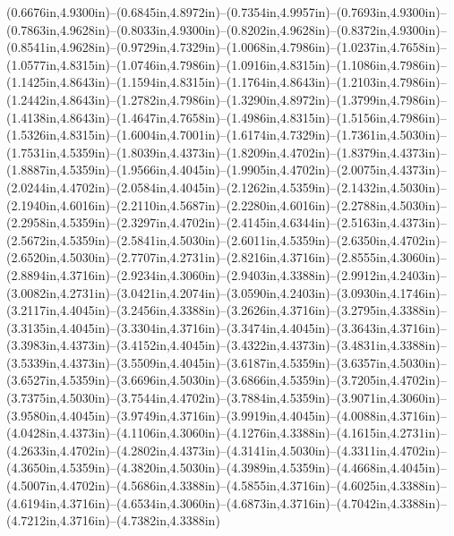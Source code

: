 (0.6676in,4.9300in)--(0.6845in,4.8972in)--(0.7354in,4.9957in)--(0.7693in,4.9300in)--(0.7863in,4.9628in)--(0.8033in,4.9300in)--(0.8202in,4.9628in)--(0.8372in,4.9300in)--(0.8541in,4.9628in)--(0.9729in,4.7329in)--(1.0068in,4.7986in)--(1.0237in,4.7658in)--(1.0577in,4.8315in)--(1.0746in,4.7986in)--(1.0916in,4.8315in)--(1.1086in,4.7986in)--(1.1425in,4.8643in)--(1.1594in,4.8315in)--(1.1764in,4.8643in)--(1.2103in,4.7986in)--(1.2442in,4.8643in)--(1.2782in,4.7986in)--(1.3290in,4.8972in)--(1.3799in,4.7986in)--(1.4138in,4.8643in)--(1.4647in,4.7658in)--(1.4986in,4.8315in)--(1.5156in,4.7986in)--(1.5326in,4.8315in)--(1.6004in,4.7001in)--(1.6174in,4.7329in)--(1.7361in,4.5030in)--(1.7531in,4.5359in)--(1.8039in,4.4373in)--(1.8209in,4.4702in)--(1.8379in,4.4373in)--(1.8887in,4.5359in)--(1.9566in,4.4045in)--(1.9905in,4.4702in)--(2.0075in,4.4373in)--(2.0244in,4.4702in)--(2.0584in,4.4045in)--(2.1262in,4.5359in)--(2.1432in,4.5030in)--(2.1940in,4.6016in)--(2.2110in,4.5687in)--(2.2280in,4.6016in)--(2.2788in,4.5030in)--(2.2958in,4.5359in)--(2.3297in,4.4702in)--(2.4145in,4.6344in)--(2.5163in,4.4373in)--(2.5672in,4.5359in)--(2.5841in,4.5030in)--(2.6011in,4.5359in)--(2.6350in,4.4702in)--(2.6520in,4.5030in)--(2.7707in,4.2731in)--(2.8216in,4.3716in)--(2.8555in,4.3060in)--(2.8894in,4.3716in)--(2.9234in,4.3060in)--(2.9403in,4.3388in)--(2.9912in,4.2403in)--(3.0082in,4.2731in)--(3.0421in,4.2074in)--(3.0590in,4.2403in)--(3.0930in,4.1746in)--(3.2117in,4.4045in)--(3.2456in,4.3388in)--(3.2626in,4.3716in)--(3.2795in,4.3388in)--(3.3135in,4.4045in)--(3.3304in,4.3716in)--(3.3474in,4.4045in)--(3.3643in,4.3716in)--(3.3983in,4.4373in)--(3.4152in,4.4045in)--(3.4322in,4.4373in)--(3.4831in,4.3388in)--(3.5339in,4.4373in)--(3.5509in,4.4045in)--(3.6187in,4.5359in)--(3.6357in,4.5030in)--(3.6527in,4.5359in)--(3.6696in,4.5030in)--(3.6866in,4.5359in)--(3.7205in,4.4702in)--(3.7375in,4.5030in)--(3.7544in,4.4702in)--(3.7884in,4.5359in)--(3.9071in,4.3060in)--(3.9580in,4.4045in)--(3.9749in,4.3716in)--(3.9919in,4.4045in)--(4.0088in,4.3716in)--(4.0428in,4.4373in)--(4.1106in,4.3060in)--(4.1276in,4.3388in)--(4.1615in,4.2731in)--(4.2633in,4.4702in)--(4.2802in,4.4373in)--(4.3141in,4.5030in)--(4.3311in,4.4702in)--(4.3650in,4.5359in)--(4.3820in,4.5030in)--(4.3989in,4.5359in)--(4.4668in,4.4045in)--(4.5007in,4.4702in)--(4.5686in,4.3388in)--(4.5855in,4.3716in)--(4.6025in,4.3388in)--(4.6194in,4.3716in)--(4.6534in,4.3060in)--(4.6873in,4.3716in)--(4.7042in,4.3388in)--(4.7212in,4.3716in)--(4.7382in,4.3388in) 
